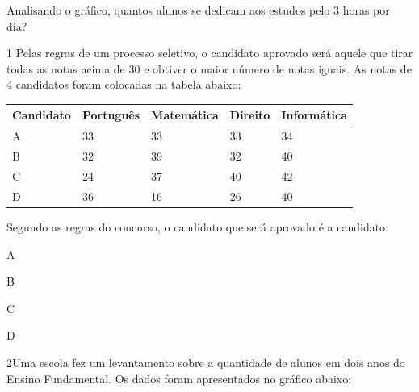 Analisando o gráfico, quantos alunos se dedicam aos estudos pelo 3 horas
por dia?


\pagebreak
{}

\num{1} Pelas regras de um processo seletivo, o candidato aprovado
será aquele que tirar todas as notas acima de 30 e obtiver o
maior número de notas iguais. As notas de 4 candidatos foram colocadas
na tabela abaixo:

\begin{longtable}[]{@{}lllll@{}}
\toprule
Candidato & Português & Matemática & Direito &
Informática\tabularnewline
\midrule
\endhead
A & 33 & 33 & 33 & 34\tabularnewline
B & 32 & 39 & 32 & 40\tabularnewline
C & 24 & 37 & 40 & 42\tabularnewline
D & 36 & 16 & 26 & 40\tabularnewline
\bottomrule
\end{longtable}

Segundo as regras do concurso, o candidato que será aprovado é a
candidato:

\begin{minipage}{.5\textwidth}
\begin{escolha}
\item
  A
\item
  B
\item
  C
\item
  D
\end{escolha}
\end{minipage}

\pagebreak
\num{2}Uma escola fez um levantamento sobre a quantidade de alunos em dois
anos do Ensino Fundamental. Os dados foram apresentados no gráfico
abaixo:

